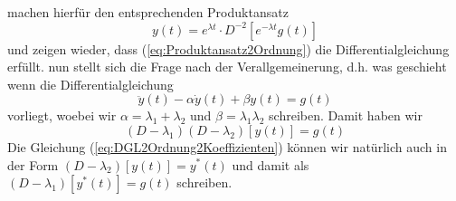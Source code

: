 machen hierfür den entsprechenden Produktansatz
\begin{equation}
  y(t)=e^{\lambda t}\cdot D^{-2}[e^{-\lambda t}g(t)]
  \label{eq:Produktansatz2Ordnung}
\end{equation}
und zeigen wieder, dass (\ref{eq:Produktansatz2Ordnung}) die
Differentialgleichung erfüllt. nun stellt sich die Frage nach der
Verallgemeinerung, d.h. was geschieht wenn die Differentialgleichung 
\begin{equation}
  \ddot{y}(t)-\alpha\dot{y}(t)+\beta y(t)=g(t)
  \label{eq:DGL2Ordnung2Koeffizienten}
\end{equation}
vorliegt, woebei wir $\alpha=\lambda_1+\lambda_2$ und $\beta=\lambda_1\lambda_2$
schreiben. Damit haben wir
\begin{equation}
  (D-\lambda_1)(D-\lambda_2)[y(t)]=g(t)
  \label{eq:DGG2KoeffizientenOperatorform}
\end{equation}
Die Gleichung (\ref{eq:DGL2Ordnung2Koeffizienten}) können wir natürlich auch in
der Form $(D-\lambda_2)[y(t)]=y^*(t)$ und damit als
$(D-\lambda_1)[y^*(t)]=g(t)$ schreiben.

